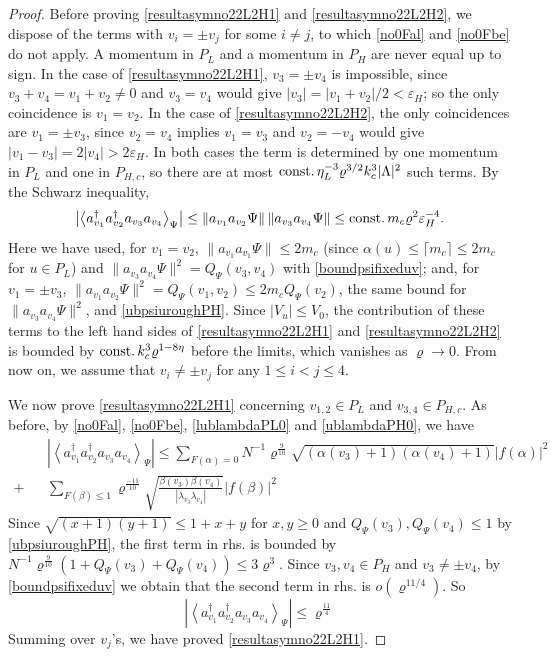 \documentclass[11pt]{article}
\numberwithin{equation}{section}
\newcommand{\beq}{\begin{equation}}
\newcommand{\eeq}{\end{equation}}
\newcommand{\beqa}{\begin{eqnarray}}
\newcommand{\eeqa}{\end{eqnarray}}
\newcommand\eps{\varepsilon}
\newcommand\const{{\rm const.\, }}
\newcommand\al{{\alpha}}
\newcommand\be{\beta}
\renewcommand\rho\varrho
\theoremstyle{definition}
\begin{document}
\begin{proof}
Before proving \eqref{resultasymno22L2H1} and \eqref{resultasymno22L2H2}, we dispose of the terms with $v_i=\pm v_j$ for some $i\neq j$, to which \eqref{no0Fal} and \eqref{no0Fbe} do not apply. A momentum in $P_L$ and a momentum in $P_{H}$ are never equal up to sign. In the case of \eqref{resultasymno22L2H1}, $v_3=\pm v_4$ is impossible, since $v_3+v_4=v_1+v_2\neq 0$ and $v_3=v_4$ would give $|v_3|=|v_1+v_2|/2<\eps_H$; so the only coincidence is $v_1=v_2$. In the case of \eqref{resultasymno22L2H2}, the only coincidences are $v_1=\pm v_3$, since $v_2=v_4$ implies $v_1=v_3$ and $v_2=-v_4$ would give $|v_1-v_3|=2|v_4|>2\eps_H$. In both cases the term is determined by one momentum in $P_L$ and one in $P_{H,c}$, so there are at most $\const \eta_L^{-3}\rho^{3/2}k_c^3|\Lambda|^2$ such terms. By the Schwarz inequality,
\[
\left|\left\langle a_{v_1}^\dagger a_{v_2}^\dagger a_{v_3}a_{v_4}\right\rangle_{\Psi}\right|\leq \|a_{v_1}a_{v_2}\Psi\|\,\|a_{v_3}a_{v_4}\Psi\|\leq \const m_c\rho^2\eps_H^{-4} .
\]
Here we have used, for $v_1=v_2$, $\|a_{v_1}a_{v_1}\Psi\|\leq 2m_c$ (since $\al(u)\leq\lceil m_c\rceil\leq 2m_c$ for $u\in P_L$) and $\|a_{v_3}a_{v_4}\Psi\|^2=Q_\Psi(v_3,v_4)$ with \eqref{boundpsifixeduv}; and, for $v_1=\pm v_3$, $\|a_{v_1}a_{v_2}\Psi\|^2=Q_\Psi(v_1,v_2)\leq 2m_cQ_\Psi(v_2)$, the same bound for $\|a_{v_3}a_{v_4}\Psi\|^2$, and \eqref{ubpsiuroughPH}. Since $|V_u|\leq V_0$, the contribution of these terms to the left hand sides of \eqref{resultasymno22L2H1} and \eqref{resultasymno22L2H2} is bounded by $\const k_c^3\rho^{1-8\eta}$ before the limits, which vanishes as $\rho\to0$. {F}rom now on, we assume that  $v_i\neq \pm v_j$ for any  $1\leq i<j\leq 4 $.

We now prove \eqref{resultasymno22L2H1} concerning  $v_{1,2}\in P_L$ and $v_{3,4}\in P_{H,c}$.  As before, by \eqref{no0Fal}, \eqref{no0Fbe},  \eqref{lublambdaPL0} and \eqref{ublambdaPH0}, we have
\beqa\nonumber
&&\left|\left\langle a_{v_1}^\dagger a_{v_2}^\dagger a_{v_3}a_{v_4}\right\rangle_{\Psi}\right|\leq\sum_{F(\al)= 0}N^{-1}\rho^{\frac{9}{10}}\sqrt{(\al(v_3)+1)(\al(v_4)+1)}|f(\al)|^2\\\nonumber
+&&\sum_{F(\be)\leq 1}\rho^{\frac{-11}{10}}\sqrt{\frac{\be(v_3)\be(v_4)}{|\lambda_{v_3}\lambda_{v_4}|}}|f(\be)|^2
\eeqa
Since $\sqrt{(x+1)(y+1)}\leq 1+x+y$ for $x,y\geq0$ and $Q_\Psi(v_3), Q_\Psi(v_4)\leq 1$ by \eqref{ubpsiuroughPH}, the first term in rhs. is bounded by $N^{-1}\rho^{\frac{9}{10}}\left(1+Q_\Psi(v_3)+Q_\Psi(v_4)\right)\leq 3\rho^3$. Since $v_3, v_4\in P_H$ and $v_3\neq\pm v_4$, by \eqref{boundpsifixeduv} we obtain that the second term in rhs. is $o(\rho^{11/4})$. So
\beq
\left|\left\langle a_{v_1}^\dagger a_{v_2}^\dagger a_{v_3}a_{v_4}\right\rangle_{\Psi}\right|\leq \rho^{\frac{11}4}
\eeq
Summing over $v_{j}$'s, we have proved  \eqref{resultasymno22L2H1}.



\end{proof}
\end{document}
